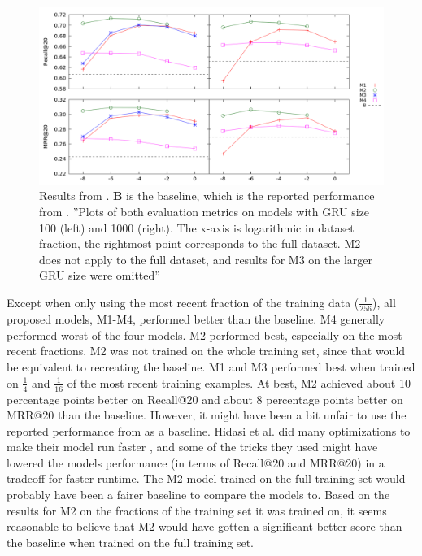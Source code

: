 \begin{figure}[htp]
	\centering
	\includegraphics[width=1.0\textwidth]{fig/improved-rnn-results.png}
	\caption{Results from \cite{DBLP:journals/corr/TanXL16}. \textbf{B} is the baseline, which is the reported performance from \cite{DBLP:journals/corr/HidasiKBT15}. ''Plots of both evaluation metrics on models with GRU size 100 (left) and 1000 (right). The x-axis is logarithmic in dataset fraction, the rightmost point corresponds to the full dataset. M2 does not apply to the full dataset, and results for M3 on the larger GRU size were omitted'' \cite{DBLP:journals/corr/TanXL16}}
	\label{fig:improved-rnn-results}
\end{figure}


Except when only using the most recent fraction of the training data ($\frac{1}{256}$), all proposed models, M1-M4, performed better than the baseline. M4 generally performed worst of the four models. M2 performed best, especially on the most recent fractions. M2 was not trained on the whole training set, since that would be equivalent to recreating the baseline. M1 and M3 performed best when trained on $\frac{1}{4}$ and $\frac{1}{16}$ of the most recent training examples. At best, M2 achieved about 10 percentage points better on Recall@20 and about 8 percentage points better on MRR@20 than the baseline. However, it might have been a bit unfair to use the reported performance from \cite{DBLP:journals/corr/HidasiKBT15} as a baseline. Hidasi et al. did many optimizations to make their model run faster \cite{email:Hidasi}, and some of the tricks they used might have lowered the models performance (in terms of Recall@20 and MRR@20) in a tradeoff for faster runtime. The M2 model trained on the full training set would probably have been a fairer baseline to compare the models to. Based on the results for M2 on the fractions of the training set it was trained on, it seems reasonable to believe that M2 would have gotten a significant better score than the baseline when trained on the full training set.

